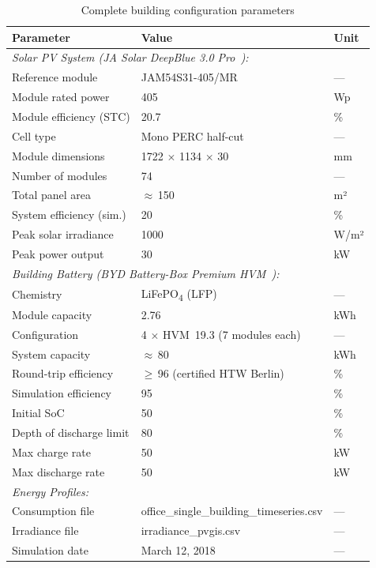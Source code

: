 \begin{table}[H]
\centering
\caption{Complete building configuration parameters}
\label{tab:app_building_params}
\begin{tabular}{@{}lll@{}}
\toprule
\textbf{Parameter} & \textbf{Value} & \textbf{Unit} \\
\midrule
\multicolumn{3}{l}{\textit{Solar PV System (JA Solar DeepBlue 3.0 Pro~\cite{ja_solar_deepblue}):}} \\
\quad Reference module & JAM54S31-405/MR & --- \\
\quad Module rated power & 405 & Wp \\
\quad Module efficiency (STC) & 20.7 & \% \\
\quad Cell type & Mono PERC half-cut & --- \\
\quad Module dimensions & 1722 $\times$ 1134 $\times$ 30 & mm \\
\quad Number of modules & 74 & --- \\
\quad Total panel area & $\approx$\,150 & m² \\
\quad System efficiency (sim.) & 20 & \% \\
\quad Peak solar irradiance & 1000 & W/m² \\
\quad Peak power output & 30 & kW \\
\midrule
\multicolumn{3}{l}{\textit{Building Battery (BYD Battery-Box Premium HVM~\cite{byd_batterybox}):}} \\
\quad Chemistry & LiFePO\textsubscript{4} (LFP) & --- \\
\quad Module capacity & 2.76 & kWh \\
\quad Configuration & 4 $\times$ HVM~19.3 (7 modules each) & --- \\
\quad System capacity & $\approx$\,80 & kWh \\
\quad Round-trip efficiency & $\geq$\,96 (certified HTW Berlin) & \% \\
\quad Simulation efficiency & 95 & \% \\
\quad Initial SoC & 50 & \% \\
\quad Depth of discharge limit & 80 & \% \\
\quad Max charge rate & 50 & kW \\
\quad Max discharge rate & 50 & kW \\
\midrule
\multicolumn{3}{l}{\textit{Energy Profiles:}} \\
\quad Consumption file & office\_single\_building\_timeseries.csv & --- \\
\quad Irradiance file & irradiance\_pvgis.csv & --- \\
\quad Simulation date & March 12, 2018 & --- \\
\bottomrule
\end{tabular}
\end{table}


